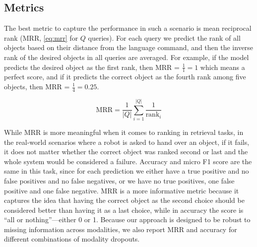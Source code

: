 \documentclass[10pt]{article} %
\begin{document}
\subsection{Metrics}
\label{sec:metrics}
The best metric to capture the performance in such a scenario is mean reciprocal rank (MRR, \cref{eq:mrr} for $Q$ queries). For each query we predict the rank of all objects based on their distance from the language command, and then the inverse rank of the desired objects in all queries are averaged. For example, if the model predicts the desired object as the first rank, then MRR = $\frac{1}{1} = 1$ which means a perfect score, and if it predicts the correct object as the fourth rank among five objects, then MRR = $\frac{1}{4}=0.25$. 

\begin{equation} \label{eq:mrr}
    \mathrm{MRR}=\frac{1}{|Q|} \sum_{i=1}^{|Q|} \frac{1}{\operatorname{rank}_{i}}
\end{equation}

While MRR is more meaningful when it comes to ranking in retrieval tasks, in the real-world scenarios where a robot is asked to hand over an object, if it fails, it does not matter whether the correct object was ranked second or last and the whole system would be considered a failure.
Accuracy and micro F1 score
are the same in this task, since for each prediction we either have a true positive and no false positives and no false negatives, or we have no true positives, one false positive and one false negative. MRR is a more informative metric because it captures the idea that having the correct object as the second choice should be considered better than having it as a last choice, while in accuracy the score is ``all or nothing''---either 0 or 1. Because our approach is designed to be robust to missing information across modalities, we also report MRR and accuracy for different combinations of modality dropouts. 
\end{document}
